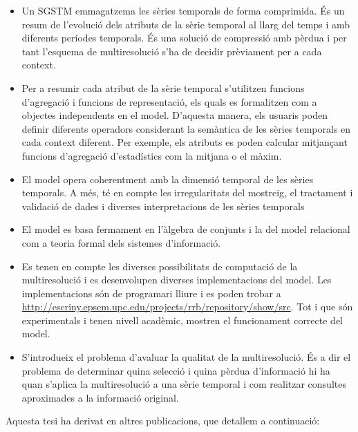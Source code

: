 \begin{itemize}

\item Un \gls{SGSTM} emmagatzema les sèries temporals de forma
  comprimida. És un resum de l'evolució dels atributs de la sèrie
  temporal al llarg del temps i amb diferents períodes temporals. És
  una solució de compressió amb pèrdua i per tant l'esquema de
  multiresolució s'ha de decidir prèviament per a cada context.

\item Per a resumir cada atribut de la sèrie temporal s'utilitzen
  funcions d'agregació i funcions de representació, els quals es
  formalitzen com a objectes independents en el model. D'aquesta
  manera, els usuaris poden definir diferents operadors considerant la
  semàntica de les sèries temporals en cada context diferent.  Per
  exemple, els atributs es poden calcular mitjançant funcions
  d'agregació d'estadístics com la mitjana o el màxim.

\item El model opera coherentment amb la dimensió temporal de les
  sèries temporals. A més, té en compte les irregularitats del
  mostreig, el tractament i validació de dades i diverses
  interpretacions de les sèries temporals

\item El model es basa fermament en l'àlgebra de conjunts i la del
  model relacional com a teoria formal dels sistemes d'informació.

\item Es tenen en compte les diverses possibilitats de computació de
  la multiresolució i es desenvolupen diverses implementacions del
  model. Les implementacions són de programari lliure i es poden
  trobar a
  \url{http://escriny.epsem.upc.edu/projects/rrb/repository/show/src}. Tot
  i que són experimentals i tenen nivell acadèmic, mostren el
  funcionament correcte del model.


\item S'introdueix el problema d'avaluar la qualitat de la
  multiresolució. És a dir el problema de determinar quina selecció i
  quina pèrdua d'informació hi ha quan s'aplica la multiresolució a
  una sèrie temporal i com realitzar consultes aproximades a la
  informació original.


\end{itemize}






Aquesta tesi ha derivat en altres publicacions, que detallem a continuació:

